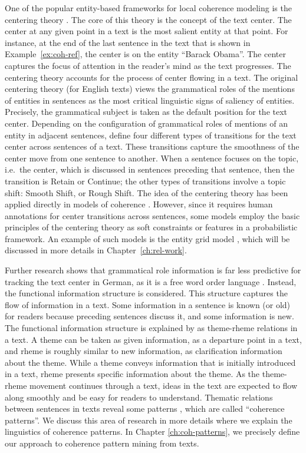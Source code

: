 One of the popular entity-based frameworks for local coherence modeling is the centering theory \cite{grosz95}. 
The core of this theory is the concept of the text center. 
The center at any given point in a text is the most salient entity at that point. 
For instance, at the end of the last sentence in the text that is shown in Example~\ref{ex:coh-ref}, the center is on the entity ``Barack Obama''.
The center captures the focus of attention in the reader's mind \cite{grosz95} as the text progresses. 
The centering theory accounts for the process of center flowing in a text. 
The original centering theory (for English texts) views the grammatical roles of the mentions of entities in sentences as the most critical linguistic signs of saliency of entities. 
Precisely, the grammatical subject is taken as the default position for the text center. 
Depending on the configuration of grammatical roles of mentions of an entity in adjacent sentences,  define four different types of transitions for the text center across sentences of a text. 
These transitions capture the smoothness of the center move from one sentence to another. 
When a sentence focuses on the topic, i.e.\ the center, which is discussed in sentences preceding that sentence, then the transition is Retain or Continue; the other types of transitions involve a topic shift: Smooth Shift, or Rough Shift. 
The idea of the centering theory has been applied directly in models of coherence \cite{karamanis04a}.  
However, since it requires human annotations for center transitions across sentences, some models employ the basic principles of the centering theory as soft constraints or features in a probabilistic framework. 
An example of such models is the entity grid model \cite{barzilay05a,barzilay08}, which will be discussed in more details in Chapter~\ref{ch:rel-work}. 

Further research shows that grammatical role information is far less predictive for tracking the text center in German, as it is a free word order language \cite{strube.acl96}. 
Instead, the functional information structure \cite{danes74a} is considered.   
This structure captures the flow of information in a text. 
Some information in a sentence is known (or old) for readers because preceding sentences discuss it, and some information is new. 
The functional information structure is explained by  as \mbox{theme-rheme} relations in a text. 
A theme can be taken as given information, as a departure point in a text, and rheme is roughly similar to new information, as clarification information about the theme. 
While a theme conveys information that is initially introduced in a text, rheme presents specific information about the theme. 
As the theme-rheme movement continues through a text, ideas in the text are expected to flow along smoothly and be easy for readers to understand. 
Thematic relations between sentences in texts reveal some patterns \cite{danes74a}, which are called ``coherence patterns''. 
We discuss this area of research in more details where we explain the linguistics of coherence patterns. 
In Chapter \ref{ch:coh-patterns}, we precisely define our approach to coherence pattern mining from texts. 

